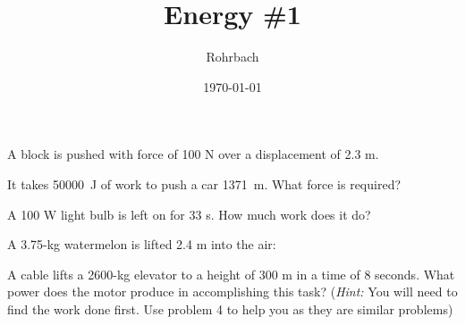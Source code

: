 \documentclass[10pt]{exam}
\title{Energy \#1}
\author{Rohrbach}
\date{\today}
\begin{document}
\maketitle

\begin{questions}

\question
  A block is pushed with force of 100 N over a displacement of 2.3 m.


\question
  It takes \SI{50000}{\joule} of work to push a car \SI{1371}{\meter}.  What force is required?
  \vs 

\question
  A 100 W light bulb is left on for 33 s.  How much work does it do?
  \vs 


\pagebreak

\question
  A 3.75-kg watermelon is lifted 2.4 m into the air: 



\question 
A cable lifts a 2600-kg elevator to a height of 300 m in a time of 8 seconds.  What power does the motor produce in accomplishing this task? (\emph{Hint:} You will need to find the work done first.  Use problem 4 to help you as they are similar problems)
\vs[2]



  
\end{questions}
\end{document}
